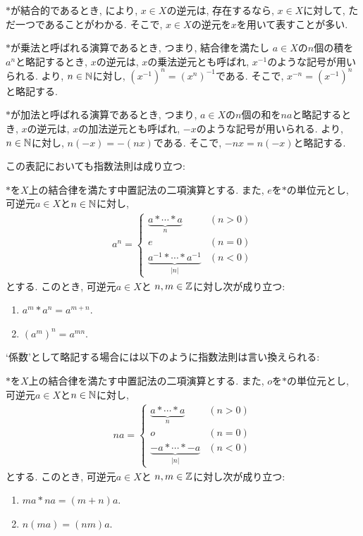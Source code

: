\begin{remark}
\label{rem:uniq:inv}
  $\ast$が結合的であるとき,
  により,
  $x\in X$の逆元は, 存在するなら, $x\in X$に対して,
  ただ一つであることがわかる.
  そこで, $x\in X$の逆元を$x$を用いて表すことが多い.

  $\ast$が乗法と呼ばれる演算であるとき,
  つまり, 結合律を満たし
  $a\in X$の$n$個の積を$a^n$と略記するとき,
  $x$の逆元は,
  $x$の乗法逆元とも呼ばれ,
  $x^{-1}$のような記号が用いられる.
  より,
  $n\in\mathbb{N}$に対し,
  $(x^{-1})^n=(x^n)^{-1}$である.
  そこで, $x^{-n}=(x^{-1})^{n}$と略記する.

  $\ast$が加法と呼ばれる演算であるとき,
  つまり, $a\in X$の$n$個の和を$na$と略記するとき,
  $x$の逆元は,
  $x$の加法逆元とも呼ばれ,
  $-x$のような記号が用いられる.
  より,
  $n\in\mathbb{N}$に対し,
  $n(-x)=-(nx)$である.
  そこで, $-nx=n(-x)$と略記する.
\end{remark}

この表記においても指数法則は成り立つ:
\begin{prop}
  $\ast$を$X$上の結合律を満たす中置記法の二項演算とする.
  また, $e$を$\ast$の単位元とし,
  可逆元$a\in X$と$n\in\mathbb{N}$に対し,
  \begin{align*}
    a^n=
    \begin{cases}
      \underbrace{a\ast \cdots \ast a}_{n} & (n>0)\\
      e & (n=0)\\
      \underbrace{a^{-1}\ast \cdots \ast a^{-1}}_{|n|} & (n<0)
    \end{cases}
  \end{align*}
  とする.
  このとき,
  可逆元$a\in X$と
  $n,m\in\mathbb{Z}$に対し次が成り立つ:
  \begin{enumerate}
    \item $a^m\ast a^n=a^{m+n}$.
    \item $(a^m)^n=a^{mn}$.
  \end{enumerate}
\end{prop}
`係数'として略記する場合には以下のように指数法則は言い換えられる:
\begin{prop}
  $\ast$を$X$上の結合律を満たす中置記法の二項演算とする.
  また, $o$を$\ast$の単位元とし,
  可逆元$a\in X$と$n\in\mathbb{N}$に対し,
  \begin{align*}
    na=
    \begin{cases}
      \underbrace{a\ast \cdots \ast a}_{n} & (n>0)\\
      o & (n=0)\\
      \underbrace{-a\ast \cdots \ast -a}_{|n|} & (n<0)
    \end{cases}
  \end{align*}
  とする.
  このとき,
  可逆元$a\in X$と
  $n,m\in\mathbb{Z}$に対し次が成り立つ:
  \begin{enumerate}
    \item $ma\ast na=(m+n)a$.
    \item $n(ma)=(nm)a$.
  \end{enumerate}
\end{prop}


